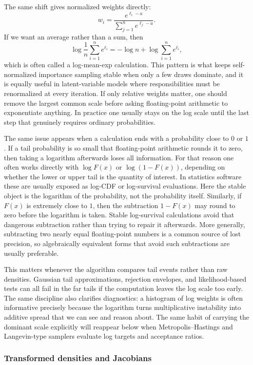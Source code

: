 The same shift gives normalized weights directly:
\[
  w_i
  =
  \frac{e^{\ell_i-a}}{\sum_{j=1}^n e^{\ell_j-a}}.
\]
If we want an average rather than a sum, then
\[
  \log \frac{1}{n}\sum_{i=1}^n e^{\ell_i}
  =
  -\log n + \log \sum_{i=1}^n e^{\ell_i},
\]
which is often called a log-mean-exp calculation.
This pattern is what keeps self-normalized importance sampling stable when only a few draws dominate, and it is equally useful in latent-variable models where responsibilities must be renormalized at every iteration.
If only relative weights matter, one should remove the largest common scale before asking floating-point arithmetic to exponentiate anything.
In practice one usually stays on the log scale until the last step that genuinely requires ordinary probabilities.

The same issue appears when a calculation ends with a probability close to $0$ or $1$.
If a tail probability is so small that floating-point arithmetic rounds it to zero, then taking a logarithm afterwards loses all information.
For that reason one often works directly with $\log F(x)$ or $\log(1-F(x))$, depending on whether the lower or upper tail is the quantity of interest.
In statistics software these are usually exposed as log-CDF or log-survival evaluations.
Here the stable object is the logarithm of the probability, not the probability itself.
Similarly, if $F(x)$ is extremely close to $1$, then the subtraction $1-F(x)$ may round to zero before the logarithm is taken.
Stable log-survival calculations avoid that dangerous subtraction rather than trying to repair it afterwards.
More generally, subtracting two nearly equal floating-point numbers is a common source of lost precision, so algebraically equivalent forms that avoid such subtractions are usually preferable.

This matters whenever the algorithm compares tail events rather than raw densities.
Gaussian tail approximations, rejection envelopes, and likelihood-based tests can all fail in the far tails if the computation leaves the log scale too early.
The same discipline also clarifies diagnostics: a histogram of log weights is often informative precisely because the logarithm turns multiplicative instability into additive spread that we can see and reason about.
The same habit of carrying the dominant scale explicitly will reappear below when Metropolis--Hastings and Langevin-type samplers evaluate log targets and acceptance ratios.

\subsubsection{Transformed densities and Jacobians}
\label{subsubsec:transformed-densities}

